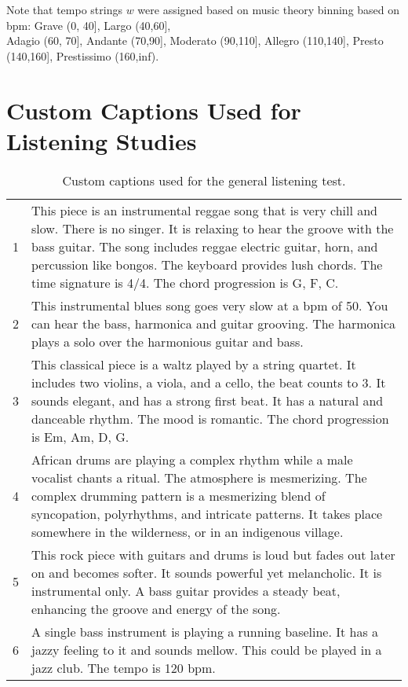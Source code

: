\documentclass[11pt]{article}
\begin{document}
\begin{table}[h]
Note that tempo strings $w$ were assigned based on music theory binning based on bpm: Grave {(0, 40]}, Largo {(40,60]}, \\ Adagio {(60, 70]}, Andante {(70,90]}, 
Moderato {(90,110]}, 
Allegro {(110,140]}, 
Presto {(140,160]}, 
Prestissimo {(160,inf)}. 
\end{table}





\clearpage
\FloatBarrier
\section{Custom Captions Used for Listening Studies}
\label{sec:captions}
\FloatBarrier


\begin{table*}[h]
\caption{Custom captions used for the general listening test. }
\footnotesize
\begin{tabular}{p{0.4cm} p{15cm}} 
\toprule
1& This piece is an instrumental reggae song that is very chill and slow. There is no singer. It is relaxing to hear the groove with the bass guitar. The song includes reggae electric guitar, horn, and percussion like bongos. The keyboard provides lush chords. The time signature is 4/4. The chord progression is G, F, C.\\ 
2& This instrumental blues song goes very slow at a bpm of 50. You can hear the bass, harmonica and guitar grooving. The harmonica plays a solo over the harmonious guitar and bass.  \\
3 & This classical piece is a waltz played by a string quartet. It includes two violins, a viola, and a cello, the beat counts to 3. It sounds elegant, and has a strong first beat. It has a natural and danceable rhythm. The mood is romantic. The chord progression is Em, Am, D, G. \\
4& African drums are playing a complex rhythm while a male vocalist chants a ritual. The atmosphere is mesmerizing. The complex drumming pattern is a mesmerizing blend of syncopation, polyrhythms, and intricate patterns. It takes place somewhere in the wilderness, or in an indigenous village. \\
5& This rock piece with guitars and drums is loud but fades out later on and becomes softer. It sounds powerful yet melancholic. It is instrumental only. A bass guitar provides a steady beat, enhancing the groove and energy of the song.    \\
6& A single bass instrument is playing a running baseline. It has a jazzy feeling to it and sounds mellow. This could be played in a jazz club. The tempo is 120 bpm.    \\

\end{tabular}
\end{table*}
\end{document}
